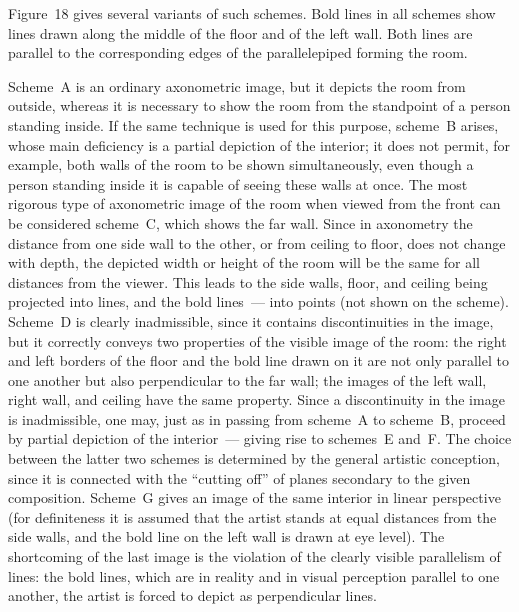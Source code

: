 Figure~18 gives several variants of such schemes.  Bold lines in all schemes show
lines drawn along the middle of the floor and of the left wall.  Both lines are parallel
to the corresponding edges of the parallelepiped forming the room.

Scheme~A is an ordinary axonometric image, but it depicts the room from outside,
whereas it is necessary to show the room from the standpoint of a person standing
inside.  If the same technique is used for this purpose, scheme~B arises, whose main
deficiency is a partial depiction of the interior; it does not permit, for example, both
walls of the room to be shown simultaneously, even though a person standing inside it
is capable of seeing these walls at once.  The most rigorous type of axonometric image
of the room when viewed from the front can be considered scheme~C, which shows the
far wall.  Since in axonometry the distance from one side wall to the other, or from
ceiling to floor, does not change with depth, the depicted width or height of the room
will be the same for all distances from the viewer.  This leads to the side walls, floor,
and ceiling being projected into lines, and the bold lines~--- into points (not shown on
the scheme).  Scheme~D is clearly inadmissible, since it contains discontinuities in the
image, but it correctly conveys two properties of the visible image of the room: the right
and left borders of the floor and the bold line drawn on it are not only parallel to one
another but also perpendicular to the far wall; the images of the left wall, right wall,
and ceiling have the same property.  Since a discontinuity in the image is inadmissible,
one may, just as in passing from scheme~A to scheme~B, proceed by partial depiction of
the interior~--- giving rise to schemes~E and~F.  The choice between the latter two
schemes is determined by the general artistic conception, since it is connected with the
``cutting off'' of planes secondary to the given composition.  Scheme~G gives an image
of the same interior in linear perspective (for definiteness it is assumed that the artist
stands at equal distances from the side walls, and the bold line on the left wall is drawn
at eye level).  The shortcoming of the last image is the violation of the clearly visible
parallelism of lines: the bold lines, which are in reality and in visual perception parallel
to one another, the artist is forced to depict as perpendicular lines.


